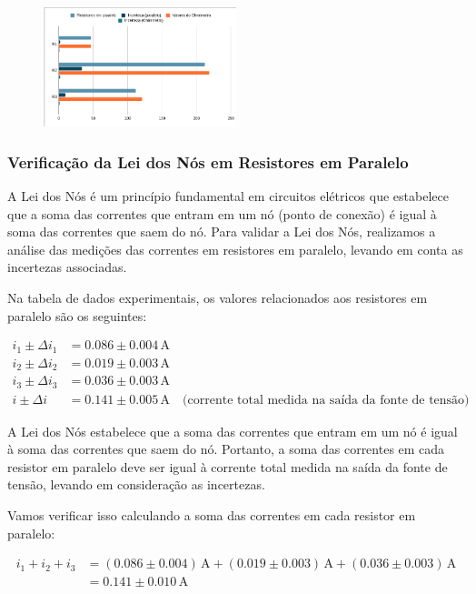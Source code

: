\documentclass{article}
\begin{document}
\begin{figure}[h]
    \centering
    \includegraphics[width=0.5\textwidth]{Associação de resistores em paralelo.png}
  \end{figure}

\subsubsection{Verificação da Lei dos Nós em Resistores em Paralelo}
A Lei dos Nós é um princípio fundamental em circuitos elétricos que estabelece que a soma das correntes que entram em um nó (ponto de conexão) é igual à soma das correntes que saem do nó. Para validar a Lei dos Nós, realizamos a análise das medições das correntes em resistores em paralelo, levando em conta as incertezas associadas.

Na tabela de dados experimentais, os valores relacionados aos resistores em paralelo são os seguintes:

\begin{align*}
i_1 \pm \Delta i_1 &= 0.086 \pm 0.004 \, \text{A} \\
i_2 \pm \Delta i_2 &= 0.019 \pm 0.003 \, \text{A} \\
i_3 \pm \Delta i_3 &= 0.036 \pm 0.003 \, \text{A} \\
i \pm \Delta i &= 0.141 \pm 0.005 \, \text{A} \quad \text{(corrente total medida na saída da fonte de tensão)}
\end{align*}

A Lei dos Nós estabelece que a soma das correntes que entram em um nó é igual à soma das correntes que saem do nó. Portanto, a soma das correntes em cada resistor em paralelo deve ser igual à corrente total medida na saída da fonte de tensão, levando em consideração as incertezas.

Vamos verificar isso calculando a soma das correntes em cada resistor em paralelo:

\begin{align*}
i_1 + i_2 + i_3 &= (0.086 \pm 0.004) \, \text{A} + (0.019 \pm 0.003) \, \text{A} + (0.036 \pm 0.003) \, \text{A} \\
&= 0.141 \pm 0.010 \, \text{A}
\end{align*}
\end{document}
